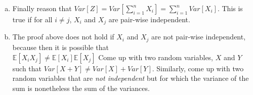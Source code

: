\documentclass[]{article}
\def \exx {\mathbb{E}}
\begin{document}
\begin{qunlist}
\begin{enumerate}[a)]
\qpart
\item Finally reason that $Var[Z] = Var[\sum\nolimits_{i=1}^n X_i] =    \sum\nolimits_{i=1}^n Var[X_i]$. This is true if for all $i \neq j$, $X_i$ and $X_j$ are pair-wise independent.
\qpart
\item The proof above does not hold if $X_i$ and $X_j$ are not pair-wise
  independent, because then it is possible that \\ $\exx[X_iX_j] \neq
  \exx[X_i]\exx[X_j]$ Come up with two random variables, $X$ and $Y$
  such that $Var[X+Y] \neq Var[X] + Var[Y]$. Similarly, come up with
  two random variables that are {\em not independent} but for which
  the variance of the sum is nonetheless the sum of the variances.

\end{enumerate}
  

\end{qunlist}
\end{document}
